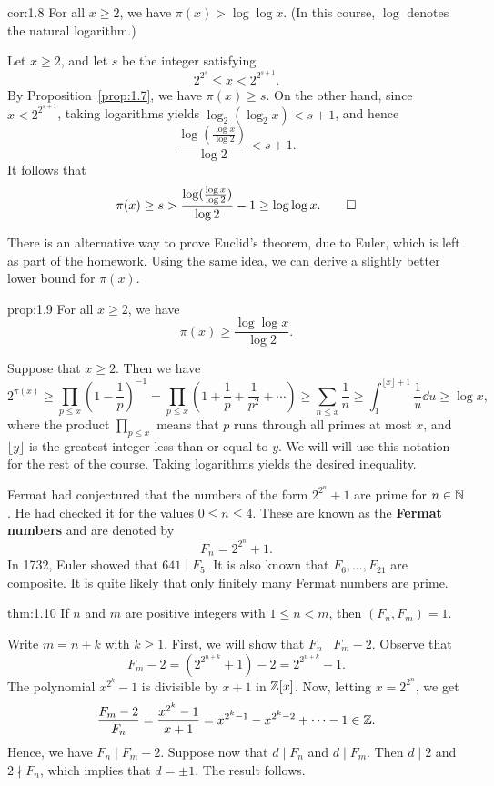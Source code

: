 \begin{cor}{cor:1.8}
For all $x \geq 2$, we have $\pi(x) > \log\log x$. (In this course, $\log$ denotes the natural logarithm.)
\end{cor}
\begin{pf}
Let $x \geq 2$, and let $s$ be the integer satisfying 
\[ 2^{2^s} \leq x < 2^{2^{s+1}}. \]
By Proposition~\ref{prop:1.7}, we have $\pi(x) \geq s$. On the other hand, since $x < 2^{2^{s+1}}$, 
taking logarithms yields $\log_2(\log_2 x) < s+1$, and hence 
\[ \frac{\log(\frac{\log x}{\log 2})}{\log 2} < s+1. \]
It follows that 
\[ \pi(x) \geq s > \frac{\log(\frac{\log x}{\log 2})}{\log 2} - 1 \geq \log\log x. \qedhere \]
\end{pf}

There is an alternative way to prove Euclid's theorem, due to Euler, which is left as part of the 
homework. Using the same idea, we can derive a slightly better lower bound for $\pi(x)$. 

\begin{prop}{prop:1.9}
For all $x \geq 2$, we have 
\[ \pi(x) \geq \frac{\log\log x}{\log 2}. \]
\end{prop}
\begin{pf}
Suppose that $x \geq 2$. Then we have 
\[ 2^{\pi(x)} \geq \prod_{p\leq x} \left(1 - \frac1p\right)^{-1} = \prod_{p\leq x} \left(1 + \frac1p
+ \frac{1}{p^2} + \cdots \right) \geq \sum_{n\leq x} \frac1n \geq \int_1^{\lfloor x \rfloor + 1}
\frac1u\dd u \geq \log x, \]
where the product $\prod_{p\leq x}$ means that $p$ runs through all primes at most $x$, and
$\lfloor y \rfloor$ is the greatest integer less than or equal to $y$. We will will use this 
notation for the rest of the course. Taking logarithms yields the desired inequality.
\end{pf}

Fermat had conjectured that the numbers of the form $2^{2^n}+1$ are prime for $n \in \mathbb{N}$. 
He had checked it for the values $0 \leq n \leq 4$. These are known as the {\bf Fermat numbers} and 
are denoted by 
\[ F_n = 2^{2^n} + 1. \] 
In 1732, Euler showed that $641 \mid F_5$. It is also known that $F_6, \dots, F_{21}$ are composite. 
It is quite likely that only finitely many Fermat numbers are prime. 

\begin{theo}[Poly\'a]{thm:1.10}
If $n$ and $m$ are positive integers with $1 \leq n < m$, then $(F_n, F_m) = 1$. 
\end{theo}
\begin{pf}
Write $m = n+k$ with $k \geq 1$. First, we will show that $F_n \mid F_m - 2$. Observe that 
\[ F_m - 2 = (2^{2^{n+k}} + 1) - 2 = 2^{2^{n+k}} - 1. \]
The polynomial $x^{2^k} - 1$ is divisible by $x+1$ in $\mathbb{Z}[x]$. Now, letting $x = 2^{2^n}$, we get 
\[ \frac{F_m-2}{F_n} = \frac{x^{2^k} - 1}{x+1} = x^{2^k-1} - x^{2^k-2} + \cdots - 1 \in \mathbb{Z}. \] 
Hence, we have $F_n \mid F_m - 2$. Suppose now that $d \mid F_n$ and $d \mid F_m$. Then 
$d \mid 2$ and $2 \nmid F_n$, which implies that $d = \pm1$. The result follows. 
\end{pf}

